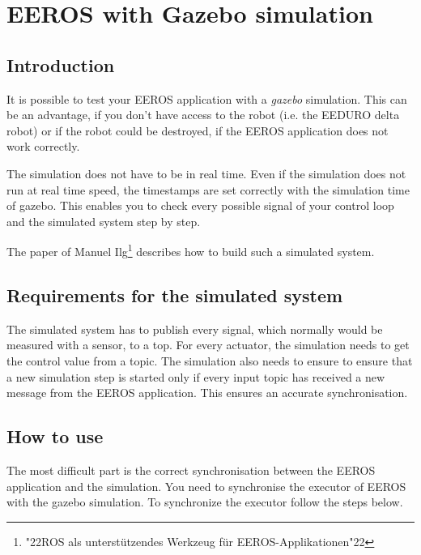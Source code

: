 \section{EEROS with Gazebo simulation}
\label{EerosWithGazebo}
\subsection{Introduction}
It is possible to test your EEROS application with a \textit{gazebo} simulation.
This can be an advantage, if you don't have access to the robot (i.e. the EEDURO delta robot) or if the robot could be destroyed, if the EEROS application does not work correctly.

The simulation does not have to be in real time.
Even if the simulation does not run at real time speed, the timestamps are set correctly with the simulation time of gazebo.
This enables you to check every possible signal of your control loop and the simulated system step by step.

The paper of Manuel Ilg\footnote{\char"22ROS als unterstützendes Werkzeug für EEROS-Applikationen\char"22} describes how to build such a simulated system.

\subsection{Requirements for the simulated system}
The simulated system has to publish every signal, which normally would be measured with a sensor, to a top.
For every actuator, the simulation needs to get the control value from a topic.
The simulation also needs to ensure to ensure that a new simulation step is started only if every input topic has received a new message from the EEROS application.
This ensures an accurate synchronisation.

\subsection{How to use}
The most difficult part is the correct synchronisation between the EEROS application and the simulation.
You need to synchronise the executor of EEROS with the gazebo simulation.
To synchronize the executor follow the steps below.

